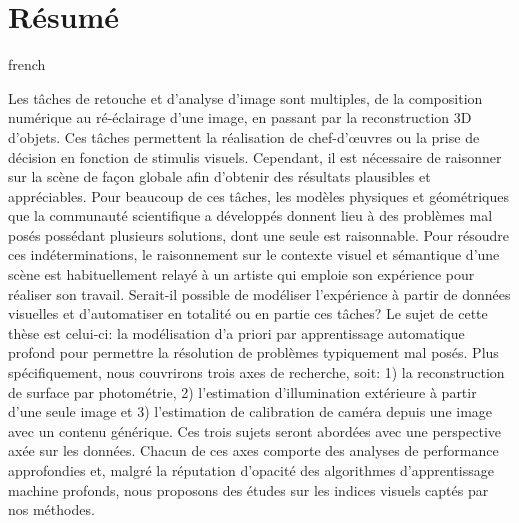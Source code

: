\chapter*{Résumé}                      %

\begin{otherlanguage*}{french}

Les tâches de retouche et d'analyse d'image sont multiples, de la composition numérique au ré-éclairage d'une image, en passant par la reconstruction 3D d'objets. Ces tâches permettent la réalisation de chef-d'\oe{}uvres ou la prise de décision en fonction de stimulis visuels. Cependant, il est nécessaire de raisonner sur la scène de façon globale afin d'obtenir des résultats plausibles et appréciables. Pour beaucoup de ces tâches, les modèles physiques et géométriques que la communauté scientifique a développés donnent lieu à des problèmes mal posés possédant plusieurs solutions, dont une seule est raisonnable. Pour résoudre ces indéterminations, le raisonnement sur le contexte visuel et sémantique d'une scène est habituellement relayé à un artiste qui emploie son expérience pour réaliser son travail. Serait-il possible de modéliser l'expérience à partir de données visuelles et d'automatiser en totalité ou en partie ces tâches? Le sujet de cette thèse est celui-ci: la modélisation d'a priori par apprentissage automatique profond pour permettre la résolution de problèmes typiquement mal posés. Plus spécifiquement, nous couvrirons trois axes de recherche, soit: 1) la reconstruction de surface par photométrie, 2) l'estimation d'illumination extérieure à partir d'une seule image et 3) l'estimation de calibration de caméra depuis une image avec un contenu générique. Ces trois sujets seront abordées avec une perspective axée sur les données. Chacun de ces axes comporte des analyses de performance approfondies et, malgré la réputation d'opacité des algorithmes d'apprentissage machine profonds, nous proposons des études sur les indices visuels captés par nos méthodes.

\end{otherlanguage*}
